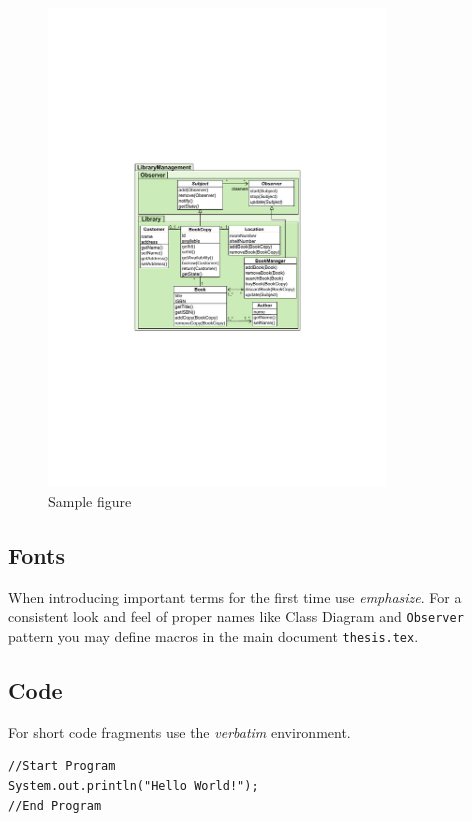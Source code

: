 \documentclass{llncs}
\newcommand{\uml}[1]{\texttt{#1}}
\newcommand{\cd}{\textsf{Class Diagram}}
\begin{document}
\begin{figure}[tb]
	\centering
	\includegraphics[width=0.8\textwidth,natwidth=610,natheight=642]{figures/figure1.pdf}
	\caption{Sample figure}
	\label{fig:samplefigure_pdf}
\end{figure}


\subsection{Fonts}

When introducing important terms for the first time use \emph{emphasize}. For a consistent look and feel of proper names like {\cd} and {\uml{Observer}} pattern you may define macros in the main document \texttt{thesis.tex}.

\subsection{Code}

For short code fragments use the \textit{verbatim} environment.

\begin{verbatim}
//Start Program
System.out.println("Hello World!");
//End Program
\end{verbatim}
\end{document}
